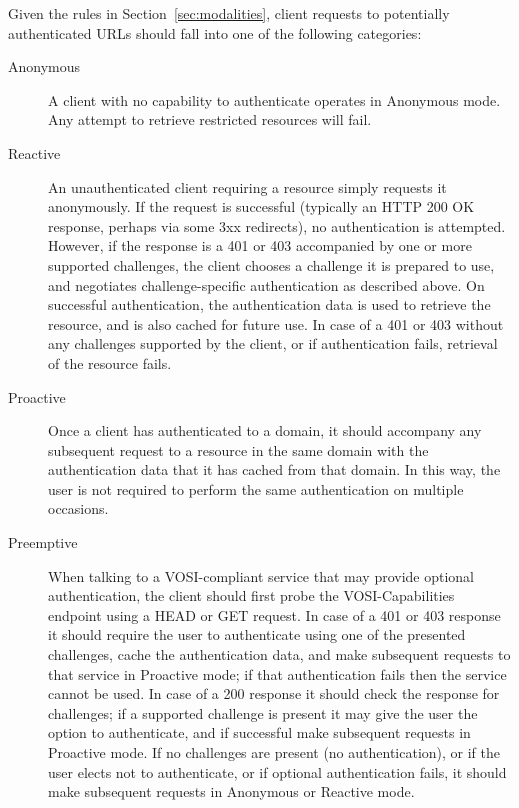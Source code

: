 \documentclass[11pt,a4paper]{ivoa}
\begin{document}
Given the rules in Section~\ref{sec:modalities},
client requests to potentially authenticated URLs should
fall into one of the following categories:
\begin{description}
\item[Anonymous]
      A client with no capability to authenticate operates in Anonymous mode.
      Any attempt to retrieve restricted resources will fail.
\item[Reactive]
      An unauthenticated client requiring a
      resource simply requests it anonymously.
      If the request is successful
      (typically an HTTP 200 OK response, perhaps via some 3xx redirects),
      no authentication is attempted.
      However, if the response is a 401 or 403 accompanied by
      one or more supported challenges,
      the client chooses a challenge it is prepared to use,
      and negotiates challenge-specific authentication as described above.
      On successful authentication, the authentication data is used to
      retrieve the resource, and is also cached for future use.
      In case of a 401 or 403 without any challenges supported by the client,
      or if authentication fails, retrieval of the resource fails.
\item[Proactive]
      Once a client has authenticated to a domain,
      it should accompany any subsequent request to a resource
      in the same domain
      with the authentication data that it has cached from that domain.
      In this way, the user is not required to perform the same
      authentication on multiple occasions.
\item[Preemptive]
      When talking to a VOSI-compliant service that may provide
      optional authentication,
      the client should first probe the VOSI-Capabilities endpoint
      using a HEAD or GET request.
      In case of a 401 or 403 response
      it should require the user to authenticate
      using one of the presented challenges,
      cache the authentication data, and make subsequent requests
      to that service in Proactive mode;
      if that authentication fails then the service cannot be used.
      In case of a 200 response it should check the response for challenges;
      if a supported challenge is present it may give the user the
      option to authenticate, and if successful make subsequent requests
      in Proactive mode.
      If no challenges are present (no authentication),
      or if the user elects not to authenticate,
      or if optional authentication fails,
      it should make subsequent requests in Anonymous or Reactive mode.
\end{description}
\end{document}
